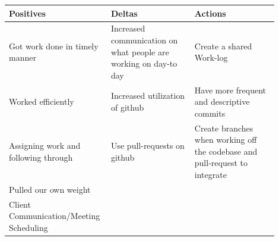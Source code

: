 \documentclass[onecolumn, draftclsnofoot,10pt, compsoc]{IEEEtran}
\begin{document}
\begin{center}
\begin{tabular}{| p{0.3\linewidth}| p{0.3\linewidth}|p{0.3\linewidth}|}
\hline
 Positives & Deltas & Actions \\ \hline 
 Got work done in timely manner & Increased communication on what people are working on day-to day & Create a shared Work-log \\ \hline
 Worked efficiently & Increased utilization of github & Have more frequent and descriptive commits \\ \hline  
 Assigning work and following through & Use pull-requests on github & Create branches when working off the codebase and pull-request to integrate \\ \hline
 Pulled our own weight & & \\ \hline
 Client Communication/Meeting Scheduling & & \\ \hline
\end{tabular}
\end{center}

\end{document}
